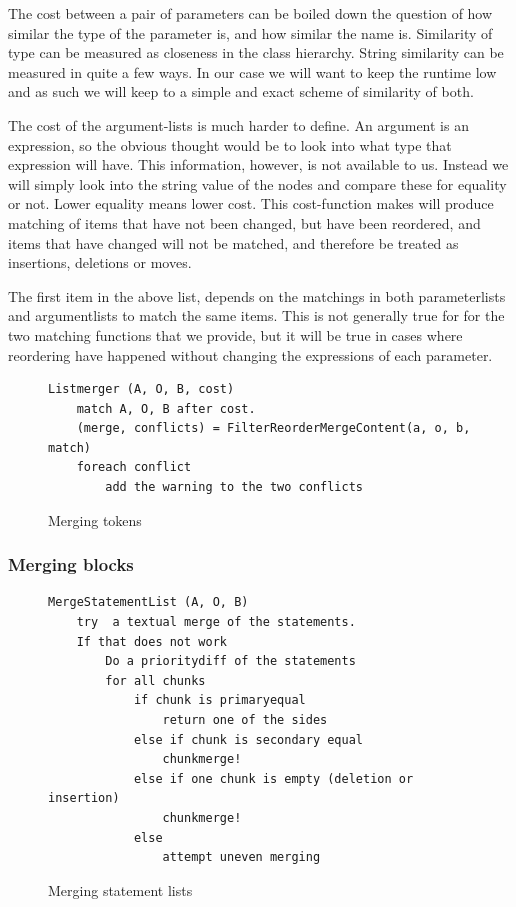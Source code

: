 \documentclass[11pt]{article}
\begin{document}
The cost between a pair of parameters can be boiled down the question of how similar the type of the parameter is, and how similar the name is. Similarity of type can be measured as closeness in the class hierarchy. String similarity can be measured in quite a few ways. In our case we will want to keep the runtime low and as such we will keep to a simple and exact scheme of similarity of both.

The cost of the argument-lists is much harder to define. An argument is an expression, so the obvious thought would be to look into what type that expression will have. This information, however, is not available to us. Instead we will simply look into the string value of the nodes and compare these for equality or not. Lower equality means lower cost. This cost-function makes will produce matching of items that have not been changed, but have been reordered, and items that have changed will not be matched, and therefore be treated as insertions, deletions or moves.

The first item in the above list, depends on the matchings in both parameterlists and argumentlists to match the same items. This is not generally true for for the two matching functions that we provide, but it will be true in cases where reordering have happened without changing the expressions of each parameter.

\begin{figure}
  \caption{Merging tokens}
  \label{Listmerger}
\begin{verbatim}
Listmerger (A, O, B, cost)
    match A, O, B after cost.
    (merge, conflicts) = FilterReorderMergeContent(a, o, b, match)
    foreach conflict
        add the warning to the two conflicts

\end{verbatim}
\end{figure}

\subsubsection{Merging blocks}

\begin{figure}
  \caption{Merging statement lists}
  \label{MergeStatementList}
\begin{verbatim}
MergeStatementList (A, O, B)
    try  a textual merge of the statements.
    If that does not work
        Do a prioritydiff of the statements
        for all chunks
            if chunk is primaryequal
                return one of the sides
            else if chunk is secondary equal
                chunkmerge!
            else if one chunk is empty (deletion or insertion)
                chunkmerge!
            else 
                attempt uneven merging
\end{verbatim}
\end{figure}
\end{document}

